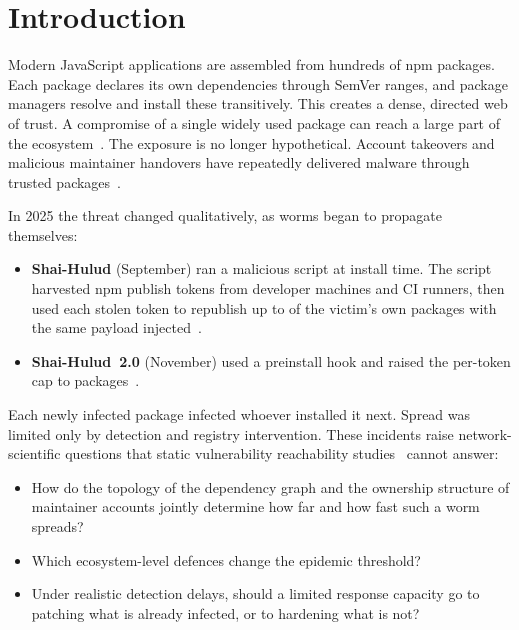 \section{Introduction}\label{sec:intro}

Modern JavaScript applications are assembled from hundreds of npm packages. Each package declares its
own dependencies through SemVer ranges, and package managers resolve and install these transitively.
This creates a dense, directed web of trust. A compromise of a single widely used package can reach a
large part of the ecosystem~\citep{zimmermann2019smallworld,kikas2017structure,decan2019empirical}.
The exposure is no longer hypothetical. Account takeovers and malicious maintainer handovers have
repeatedly delivered malware through trusted packages~\citep{npm2018eventstream,github2021uaparser,
aikido2025chalkdebug,ohm2020backstabber}.

In 2025 the threat changed qualitatively, as worms began to propagate themselves:
\begin{itemize}
  \item \textbf{Shai-Hulud} (September) ran a malicious script at install time. The script harvested
        npm publish tokens from developer machines and CI runners, then used each stolen token to
        republish up to \CalOneCap{} of the victim's own packages with the same payload
        injected~\citep{stepsecurity2025shaihulud,socket2025shaihulud,cisa2025npm}.
  \item \textbf{Shai-Hulud~2.0} (November) used a preinstall hook and raised the per-token cap to
        \CalTwoCap{} packages~\citep{wiz2025shaihulud2,datadog2025shaihulud2}.
\end{itemize}
Each newly infected package infected whoever installed it next. Spread was limited only by detection and
registry intervention. These incidents raise network-scientific questions that static vulnerability
reachability studies~\citep{decan2018vulnerabilities,liu2022demystifying,zerouali2022vulnerabilities}
cannot answer:
\begin{itemize}
  \item How do the topology of the dependency graph and the ownership structure of maintainer accounts
        jointly determine how far and how fast such a worm spreads?
  \item Which ecosystem-level defences change the epidemic threshold?
  \item Under realistic detection delays, should a limited response capacity go to patching what is
        already infected, or to hardening what is not?
\end{itemize}

